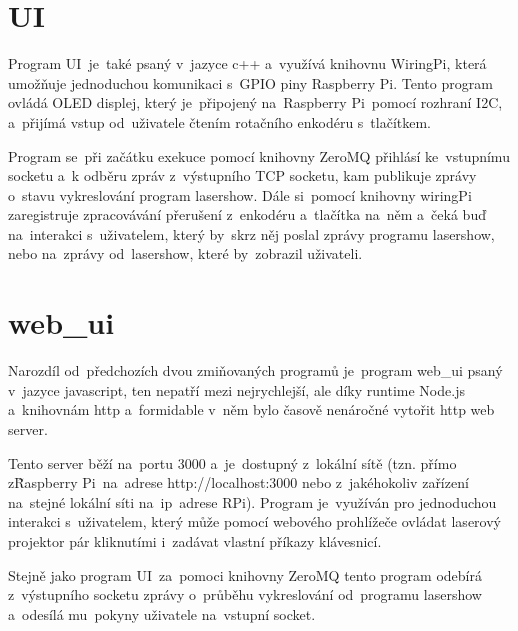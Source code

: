 \section{UI}

Program UI~je~také psaný v~jazyce c++ a~využívá knihovnu WiringPi, která umožňuje jednoduchou komunikaci s~GPIO piny Raspberry Pi. Tento program ovládá OLED displej, který je~připojený na~Raspberry Pi~pomocí rozhraní I2C, a~přijímá vstup od~uživatele čtením rotačního enkodéru s~tlačítkem.

Program se~při začátku exekuce pomocí knihovny ZeroMQ přihlásí ke~vstupnímu socketu a~k odběru zpráv z~výstupního TCP socketu, kam publikuje zprávy o~stavu vykreslování program lasershow. Dále si~pomocí knihovny wiringPi zaregistruje zpracovávání přerušení z~enkodéru a~tlačítka na~něm a~čeká buď na~interakci s~uživatelem, který by~skrz něj poslal zprávy programu lasershow, nebo na~zprávy od~lasershow, které by~zobrazil uživateli.


\section{web\_ui}

Narozdíl od~předchozích dvou zmiňovaných programů je~program web\_ui psaný v~jazyce javascript, ten nepatří mezi nejrychlejší, ale díky runtime Node.js a~knihovnám http a~formidable v~něm bylo časově nenáročné vytořit http web server.

Tento server běží na~portu 3000 a~je~dostupný z~lokální sítě (tzn. přímo z\~Raspberry Pi~na~adrese http://localhost:3000 nebo z~jakéhokoliv zařízení na~stejné lokální síti na~ip~adrese RPi).
Program je~využíván pro jednoduchou interakci s~uživatelem, který může pomocí webového prohlížeče ovládat laserový projektor pár kliknutími i~zadávat vlastní příkazy klávesnicí.




Stejně jako program UI~za~pomoci knihovny ZeroMQ tento program odebírá z~výstupního socketu zprávy o~průběhu vykreslování od~programu lasershow a~odesílá mu~pokyny uživatele na~vstupní socket.


